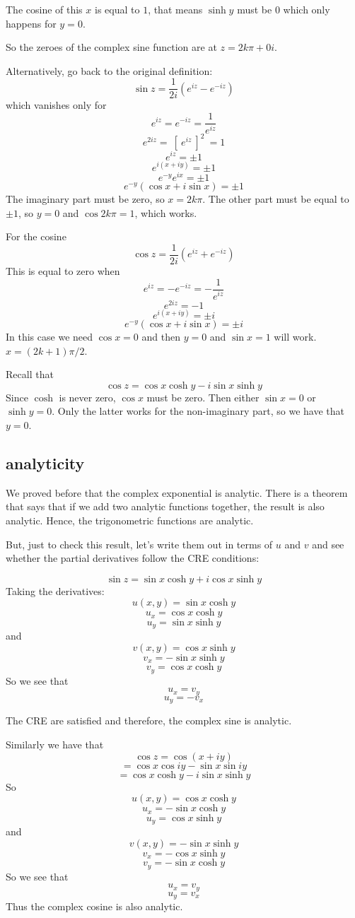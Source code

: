 \documentclass[11pt, oneside]{article}   	%
\begin{document}
The cosine of this $x$ is equal to $1$, that means $\sinh y$ must be $0$ which only happens for $y = 0$.

So the zeroes of the complex sine function are at $z = 2k \pi + 0i$.

Alternatively, go back to the original definition:
\[ \sin z = \frac{1}{2i} (e^{iz} - e^{-iz}) \]
which vanishes only for 
\[ e^{iz} = e^{-iz} = \frac{1}{e^{iz}} \]
\[ e^{2iz} = \ [ \ e^{iz} \ ]^2 \ = 1 \]
\[ e^{iz} = \pm 1 \]
\[ e^{i(x + iy)} = \pm 1 \]
\[ e^{-y}e^{ix} = \pm 1 \]
\[ e^{-y} (\cos x + i \sin x) = \pm 1 \]
The imaginary part must be zero, so $x = 2k \pi$.  The other part must be equal to $\pm 1$, so $y = 0$ and $\cos 2k \pi = 1$, which works.

For the cosine
\[ \cos z = \frac{1}{2i} (e^{iz} + e^{-iz}) \]
This is equal to zero when
\[ e^{iz} = - e^{-iz} = -\frac{1}{e^{iz}} \]
\[ e^{2iz} = -1 \]
\[ e^{i(x + iy)} = \pm i \]
\[ e^{-y} (\cos x + i \sin x) = \pm i \]
In this case we need $\cos x = 0$ and then $y=0$ and $\sin x = 1$ will work.  $x = (2k + 1)\pi / 2$.

Recall that
\[ \cos z = \cos x \cosh y - i \sin x \sinh y \]
Since $\cosh$ is never zero, $\cos x$ must be zero.  Then either $\sin x = 0$ or $\sinh y = 0$.  Only the latter works for the non-imaginary part, so we have that $y = 0$.

\subsection*{analyticity}
We proved before that the complex exponential is analytic.  There is a theorem that says that if we add two analytic functions together, the result is also analytic.  Hence, the trigonometric functions are analytic.

But, just to check this result, let's write them out in terms of $u$ and $v$ and see whether the partial derivatives follow the CRE conditions:

\[ \sin z = \sin x \cosh y + i \cos x \sinh y \]
Taking the derivatives:
\[ u(x,y) =  \sin x \cosh y \]
\[ u_x = \cos x \cosh y \]
\[ u_y = \sin x \sinh y \]
and
\[ v(x,y) = \cos x \sinh y \]
\[ v_x = - \sin x \sinh y \]
\[ v_y = \cos x \cosh y \]
So we see that
\[ u_x = v_y \]
\[ u_y = -v_x \]

The CRE are satisfied and therefore, the complex sine is analytic.

Similarly we have that 
\[ \cos z = \cos (x + iy) \]
\[ = \cos x \cos iy - \sin x \sin iy \]
\[ = \cos x \cosh y - i \sin x \sinh y \]
So
\[ u(x,y) =  \cos x \cosh y \]
\[ u_x = - \sin x \cosh y \]
\[ u_y = \cos x \sinh y \]
and
\[ v(x,y) = -\sin x \sinh y \]
\[ v_x = -\cos x \sinh y \]
\[ v_y = -\sin x \cosh y \]
So we see that
\[ u_x = v_y \]
\[ u_y = v_x \]
Thus the complex cosine is also analytic.
\end{document}
